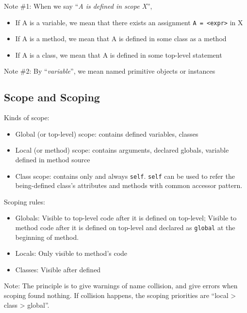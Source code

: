 \documentclass[]{article}
\numberwithin{equation}{section}
\numberwithin{figure}{section}
\numberwithin{table}{section}
\begin{document}
Note \#1: When we say ``\emph{A is defined in scope X}'',

\begin{itemize}
\itemsep1pt\parskip0pt
\item
  If A is a variable, we mean that there exists an assignment
  \texttt{A = \textless{}expr\textgreater{}} in X
\item
  If A is a method, we mean that A is defined in some class as a method
\item
  If A is a class, we mean that A is defined in some top-level
  statement
\end{itemize}

Note \#2: By ``\emph{variable}'', we mean named primitive objects or
instances

\subsection{Scope and Scoping}\label{scope-and-scoping}

Kinds of scope:

\begin{itemize}
\itemsep1pt\parskip0pt
\item
  Global (or top-level) scope: contains defined variables, classes
\item
  Local (or method) scope: contains arguments, declared globals,
  variable defined in method source
\item
  Class scope: contains only and always \texttt{self}. \texttt{self} can be used
  to refer the being-defined class's attributes and methods with common accessor
  pattern.
\end{itemize}

Scoping rules:

\begin{itemize}
\itemsep1pt\parskip0pt
\item
  Globals: Visible to top-level code after it is defined on top-level;
  Visible to method code after it is defined on top-level and declared
  as \texttt{global} at the beginning of method.
\item
  Locals: Only visible to method's code
\item
  Classes: Visible after defined
\end{itemize}

Note: The principle is to give warnings of name collision, and
give errors when scoping found nothing. If collision happens, the scoping priorities
are ``local \textgreater{} class \textgreater{} global''.
\end{document}
